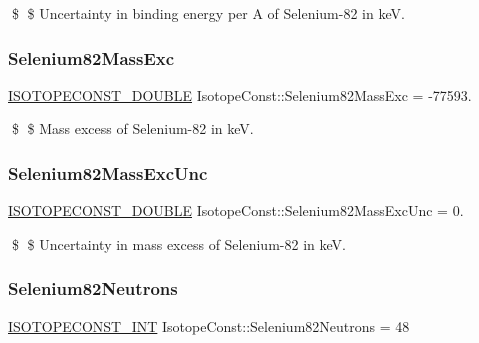 \$ \$ Uncertainty in binding energy per A of Selenium-\/82 in keV. \mbox{\label{group___isotope_const-_selenium-_se82_ga6230b94de5112374010dfd0cd6a087a8}} 
\subsubsection{\texorpdfstring{Selenium82\+Mass\+Exc}{Selenium82MassExc}}
{\footnotesize\ttfamily \mbox{\hyperlink{group___isotope_const-_macros_ga8f45a7272ce02c0b4c65c44636ed719a}{I\+S\+O\+T\+O\+P\+E\+C\+O\+N\+S\+T\+\_\+\+D\+O\+U\+B\+LE}} Isotope\+Const\+::\+Selenium82\+Mass\+Exc = -\/77593.}

\$ \$ Mass excess of Selenium-\/82 in keV. \mbox{\label{group___isotope_const-_selenium-_se82_gadd9419793c5857351a8528e1d0a1f086}} 
\subsubsection{\texorpdfstring{Selenium82\+Mass\+Exc\+Unc}{Selenium82MassExcUnc}}
{\footnotesize\ttfamily \mbox{\hyperlink{group___isotope_const-_macros_ga8f45a7272ce02c0b4c65c44636ed719a}{I\+S\+O\+T\+O\+P\+E\+C\+O\+N\+S\+T\+\_\+\+D\+O\+U\+B\+LE}} Isotope\+Const\+::\+Selenium82\+Mass\+Exc\+Unc = 0.}

\$ \$ Uncertainty in mass excess of Selenium-\/82 in keV. \mbox{\label{group___isotope_const-_selenium-_se82_ga0811c68900882781447ef671025ab75e}} 
\subsubsection{\texorpdfstring{Selenium82\+Neutrons}{Selenium82Neutrons}}
{\footnotesize\ttfamily \mbox{\hyperlink{group___isotope_const-_macros_ga5f18360b3e99483a35c32d789e62621c}{I\+S\+O\+T\+O\+P\+E\+C\+O\+N\+S\+T\+\_\+\+I\+NT}} Isotope\+Const\+::\+Selenium82\+Neutrons = 48}

